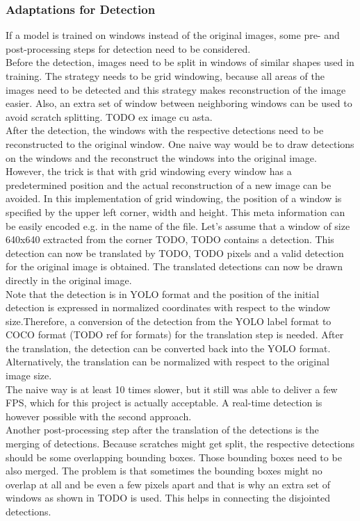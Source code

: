 \subsubsection{Adaptations for Detection}
If a model is trained on windows instead of the original images, some pre- and post-processing steps for detection need to be considered. \\
Before the detection, images need to be split in windows of similar shapes used in training. The strategy needs to be grid windowing, because all areas of the images need to be detected and this strategy makes reconstruction of the image easier. Also, an extra set of window between neighboring windows can be used to avoid scratch splitting. TODO ex image cu asta. \\
After the detection, the windows with the respective detections need to be reconstructed to the original window. One naive way would be to draw detections on the windows and the reconstruct the windows into the original image. However, the trick is that with grid windowing every window has a predetermined position and the actual reconstruction of a new image can be avoided. In this implementation of grid windowing, the position of a window is specified by the upper left corner, width and height. This meta information can be easily encoded e.g. in the name of the file. Let's assume that a window of size 640x640 extracted from the corner TODO, TODO contains a detection. This detection can now be translated by TODO, TODO pixels and a valid detection for the original image is obtained. The translated detections can now be drawn directly in the original image.\\
 Note that the detection is in YOLO format and the position of the initial detection is expressed in normalized coordinates with respect to the window size.Therefore, a conversion of the detection from the YOLO label format to COCO format (TODO ref for formats) for the translation step is needed. After the translation, the detection can be converted back into the YOLO format.  Alternatively, the translation can be normalized with respect to the original image size.\\
 The naive way is at least 10 times slower, but it still was able to deliver a few FPS, which for this project is actually acceptable. A real-time detection is however possible with the second approach. \\
 Another post-processing step after the translation of the detections is the merging of detections. Because scratches might get split, the respective detections should be some overlapping bounding boxes. Those bounding boxes need to be also merged. The problem is that sometimes the bounding boxes might no overlap at all and be even a few pixels apart and that is why an extra set of windows as shown in TODO is used. This helps in connecting the disjointed detections. \\



